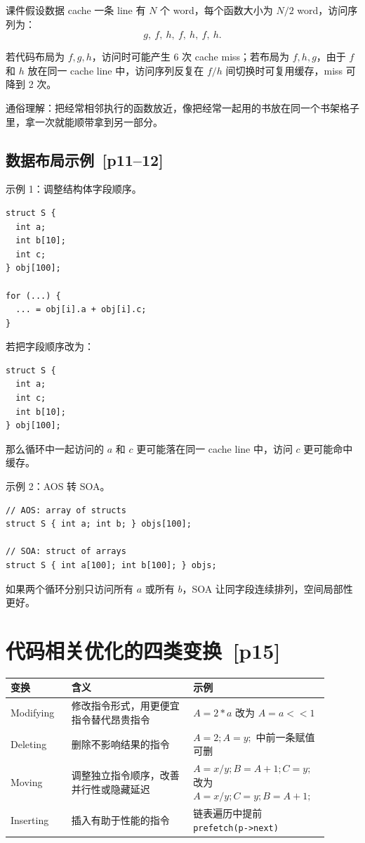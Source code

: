 \documentclass[UTF8,fontset=none,11pt]{ctexart}
\newcommand{\pg}[1]{\texorpdfstring{{\small\color{graytext}\,[p#1]}}{ [p#1]}}
\begin{document}
课件假设数据 cache 一条 line 有 \(N\) 个 word，每个函数大小为 \(N/2\) word，访问序列为：
\[
g,\ f,\ h,\ f,\ h,\ f,\ h.
\]

若代码布局为 \(f,g,h\)，访问时可能产生 6 次 cache miss；若布局为 \(f,h,g\)，由于 \(f\) 和 \(h\) 放在同一 cache line 中，访问序列反复在 \(f/h\) 间切换时可复用缓存，miss 可降到 2 次。

通俗理解：把经常相邻执行的函数放近，像把经常一起用的书放在同一个书架格子里，拿一次就能顺带拿到另一部分。

\subsection{数据布局示例 \pg{11--12}}

示例 1：调整结构体字段顺序。

\begin{verbatim}
struct S {
  int a;
  int b[10];
  int c;
} obj[100];

for (...) {
  ... = obj[i].a + obj[i].c;
}
\end{verbatim}

若把字段顺序改为：

\begin{verbatim}
struct S {
  int a;
  int c;
  int b[10];
} obj[100];
\end{verbatim}

那么循环中一起访问的 \(a\) 和 \(c\) 更可能落在同一 cache line 中，访问 \(c\) 更可能命中缓存。

示例 2：AOS 转 SOA。

\begin{verbatim}
// AOS: array of structs
struct S { int a; int b; } objs[100];

// SOA: struct of arrays
struct S { int a[100]; int b[100]; } objs;
\end{verbatim}

如果两个循环分别只访问所有 \(a\) 或所有 \(b\)，SOA 让同字段连续排列，空间局部性更好。

\section{代码相关优化的四类变换 \pg{15}}

\begin{longtable}{L{0.18\linewidth}L{0.36\linewidth}L{0.36\linewidth}}
\toprule
变换 & 含义 & 示例 \\
\midrule
Modifying & 修改指令形式，用更便宜指令替代昂贵指令 & \(A=2*a\) 改为 \(A=a<<1\) \\
Deleting & 删除不影响结果的指令 & \(A=2; A=y;\) 中前一条赋值可删 \\
Moving & 调整独立指令顺序，改善并行性或隐藏延迟 & \(A=x/y; B=A+1; C=y;\) 改为 \(A=x/y; C=y; B=A+1;\) \\
Inserting & 插入有助于性能的指令 & 链表遍历中提前 \texttt{prefetch(p->next)} \\
\bottomrule
\end{longtable}
\end{document}

